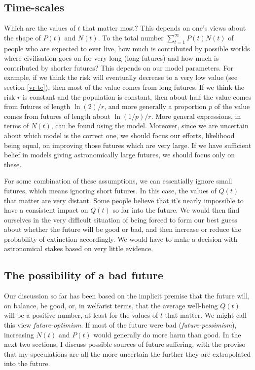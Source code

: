 \documentclass[british]{article}
\begin{document}
\subsection{Time-scales}\label{section:time-scales}
Which are the values of $t$ that matter most? This depends on one's views about the shape of $P(t)$ and $N(t)$. To the total number $\sum_{t=1}^\infty P(t)N(t)$ of people who are expected to ever live, how much is contributed by possible worlds where civilisation goes on for very long (long futures) and how much is contributed by shorter futures? This depends on our model parameters. For example, if we think the risk will eventually decrease to a very low value (see section \ref{vr-te}), then most of the value comes from long futures. If we think the risk $r$ is constant and the population is constant, then about half the value comes from futures of length $\ln(2)/r$, and more generally a proportion $p$ of the value comes from futures of length about $\ln(1/p)/r$. More general expressions, in terms of $N(t)$, can be found using the model. Moreover, since we are uncertain about which model is the correct one, we should focus our efforts, likelihood being equal, on improving those futures which are very large. If we have sufficient belief in models giving astronomically large futures, we should focus only on these.

For some combination of these assumptions, we can essentially ignore small futures, which means ignoring short futures. In this case, the values of $Q(t)$ that matter are very distant. Some people believe that it's nearly impossible to have a consistent impact on $Q(t)$ so far into the future. We would then find ourselves in the very difficult situation of being forced to form our best guess about whether the future will be good or bad, and then increase or reduce the probability of extinction accordingly. We would have to make a decision with astronomical stakes based on very little evidence.

\subsection{The possibility of a bad future} Our discussion so far has been based on the implicit premise that the future will, on balance, be good, or, in welfarist terms, that the average well-being \(Q(t)\) will be a positive number, at least for the values of \(t\) that matter. We might call this view \emph{future-optimism}. If most of the future were bad (\emph{future-pessimism}), increasing \(N(t)\) and \(P(t)\) would generally do more harm than good. In the next two sections, I discuss possible sources of future suffering, with the proviso that my speculations are all the more uncertain the further they are extrapolated into the future.
\end{document}
